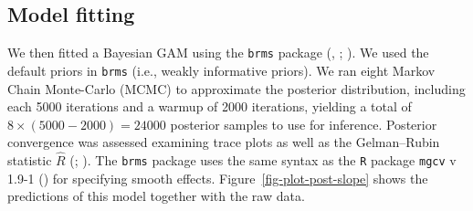\documentclass[
  doc,
  floatsintext,
  longtable,
  a4paper,
  nolmodern,
  notxfonts,
  notimes,
  colorlinks=true,linkcolor=blue,citecolor=blue,urlcolor=blue]{apa7}
\begin{document}
\subsection{Model fitting}\label{model-fitting}

We then fitted a Bayesian GAM using the \texttt{brms} package
(, ;
). We used the
default priors in \texttt{brms} (i.e., weakly informative priors). We
ran eight Markov Chain Monte-Carlo (MCMC) to approximate the posterior
distribution, including each 5000 iterations and a warmup of 2000
iterations, yielding a total of \(8 \times (5000-2000) = 24000\)
posterior samples to use for inference. Posterior convergence was
assessed examining trace plots as well as the Gelman--Rubin statistic
\(\hat{R}\) (;
). The \texttt{brms}
package uses the same syntax as the \texttt{R} package \texttt{mgcv} v
1.9-1 () for specifying smooth effects.
Figure~\ref{fig-plot-post-slope} shows the predictions of this model
together with the raw data.
\end{document}

